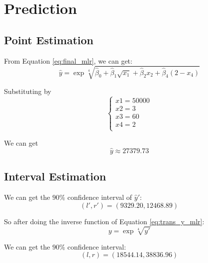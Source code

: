 \section{Prediction}


\subsection{Point Estimation}

From Equation \ref{eq:final_mlr}, we can get:
\begin{equation}
    \hat{y} = \exp{\sqrt[4]{\hat{\beta}_0 +\hat{\beta}_1 \sqrt{x_1} + \hat{\beta}_2 x_2 + \hat{\beta}_4 (2 - x_4)}}
\end{equation}

Substituting by
\begin{equation}
\begin{cases}
x1 = 50000\\
x2 = 3\\
x3 = 60\\
x4 = 2\\
\end{cases}
\end{equation}

We can get
\begin{equation}\label{eq:prediction}
\hat{y}\approx 27379.73
\end{equation}

\subsection{Interval Estimation}

We can get the $90\%$ confidence interval of $\hat{y}'$:
\begin{equation}
    (l', r') = (9329.20, 12468.89)
\end{equation}

So after doing the inverse function of Equation \ref{eq:trans_y_mlr}:
\begin{equation}
y = \exp\sqrt[4]{y'}
\end{equation}

We can get the $90\%$ confidence interval:
\begin{equation}\label{eq:conf}
    (l, r) = (18544.14, 38836.96)
\end{equation}